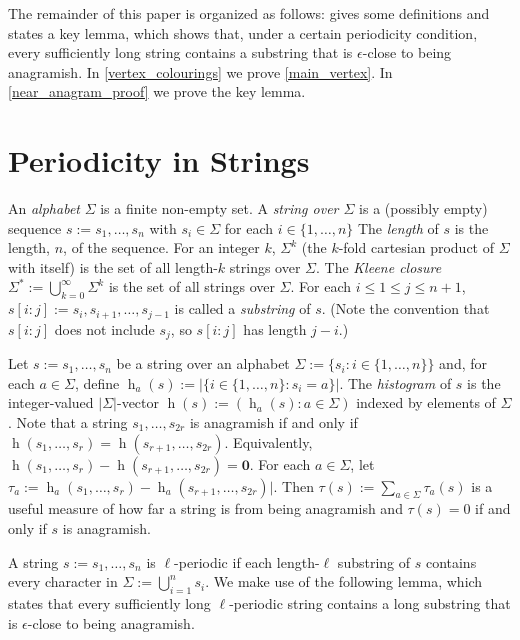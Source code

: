 \documentclass{patmorin}
\DeclareMathOperator{\hist}{h}
\begin{document}

The remainder of this paper is organized as follows:  gives some definitions and states a key lemma, which shows that, under a certain periodicity condition, every sufficiently long string contains a substring that is $\epsilon$-close to being anagramish.
In \cref{vertex_colourings} we prove \cref{main_vertex}.  In \cref{near_anagram_proof} we prove the key lemma.

\section{Periodicity in Strings}
\label{near_anagram_statement}

An \emph{alphabet} $\Sigma$ is a finite non-empty set.  A \emph{string over $\Sigma$} is a (possibly empty) sequence $s:=s_1,\ldots,s_n$ with $s_i\in\Sigma$ for each $i\in\{1,\ldots,n\}$ The \emph{length} of $s$ is the length, $n$, of the sequence. For an integer $k$, $\Sigma^k$ (the $k$-fold cartesian product of $\Sigma$ with itself) is the set of all length-$k$ strings over $\Sigma$.  The \emph{Kleene closure} $\Sigma^*:=\bigcup_{k=0}^\infty \Sigma^k$ is the set of all strings over $\Sigma$.  For each $i\le 1\le j\le n+1$, $s[i\mathbin{:}j]:=s_i,s_{i+1},\ldots,s_{j-1}$ is called a \emph{substring} of $s$. (Note the convention that $s[i\mathbin{:}j]$ does not include $s_j$, so $s[i\mathbin{:}j]$ has length $j-i$.)

Let $s:=s_1,\ldots,s_n$ be a string over an alphabet $\Sigma:=\{s_i:i\in\{1,\ldots,n\}\}$ and, for each $a\in \Sigma$, define $\hist_a(s):=|\{i\in\{1,\ldots,n\}:s_i=a\}|$.  The \emph{histogram} of $s$ is the integer-valued $|\Sigma|$-vector $\hist(s):=(\hist_a(s):a\in\Sigma)$ indexed by elements of $\Sigma$.  Note that a string $s_1,\ldots,s_{2r}$ is anagramish if and only if $\hist(s_1,\ldots,s_r)=\hist(s_{r+1},\ldots,s_{2r})$.  Equivalently, $\hist(s_1,\ldots,s_r)-\hist(s_{r+1},\ldots,s_{2r})=\boldsymbol{0}$.
For each $a\in\Sigma$, let $\tau_a:=\hist_a(s_1,\ldots,s_r)-\hist_a(s_{r+1},\ldots,s_{2r})|$.
Then $\tau(s):=\sum_{a\in\Sigma}\tau_a(s)$ is a useful measure of how far a string is from being anagramish and $\tau(s)=0$ if and only if $s$ is anagramish.

A string $s:=s_1,\ldots,s_n$ is $\ell$-periodic if each length-$\ell$ substring of $s$ contains every character in $\Sigma:=\bigcup_{i=1}^n s_i$.  We make use of the following lemma, which states that every sufficiently long $\ell$-periodic string contains a long substring that is $\epsilon$-close to being anagramish.
\end{document}
